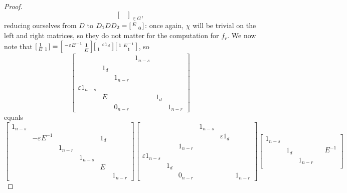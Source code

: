 \begin{proof}
\[{\begin{bmatrix}
	\end{bmatrix}}_{\in G},\]
	reducing ourselves from $D$ to $D_1DD_2=\begin{bsmallmatrix}
		E \\ & 0
	\end{bsmallmatrix}$: once again, $\chi$ will be trivial on the left and right matrices, so they do not matter for the computation for $f_r$. We now note that $\begin{bsmallmatrix}
		1 \\ E & 1
	\end{bsmallmatrix}=\begin{bsmallmatrix}
		-\varepsilon E^{-1} & 1 \\ & E
	\end{bsmallmatrix}\begin{bsmallmatrix}
		& \varepsilon1_d \\ 1
	\end{bsmallmatrix}\begin{bsmallmatrix}
		1 & E^{-1} \\ & 1
	\end{bsmallmatrix}$, so
	\[\begin{bmatrix}
		&&& 1_{n-s} \\ & 1_d \\ && 1_{n-r} \\
		\varepsilon1_{n-s} \\ & E &&& 1_d \\ && 0_{n-r} &&& 1_{n-r}
	\end{bmatrix}\]
	equals
	\[\begin{bmatrix}
		1_{n-s} \\ & -\varepsilon E^{-1} &&& 1_d \\ && 1_{n-r} \\
		&&& 1_{n-s} \\ &&&& E \\ &&&&& 1_{n-r}
	\end{bmatrix}\begin{bmatrix}
		&&& 1_{n-s} \\ &&&& \varepsilon1_d \\ && 1_{n-r} \\
		\varepsilon1_{n-s} \\ & 1_d \\ && 0_{n-r} &&& 1_{n-r}
	\end{bmatrix}\begin{bmatrix}
		1_{n-s} \\ & 1_d &&& E^{-1} \\ && 1_{n-r} \\

\end{bmatrix}\]
\end{proof}

